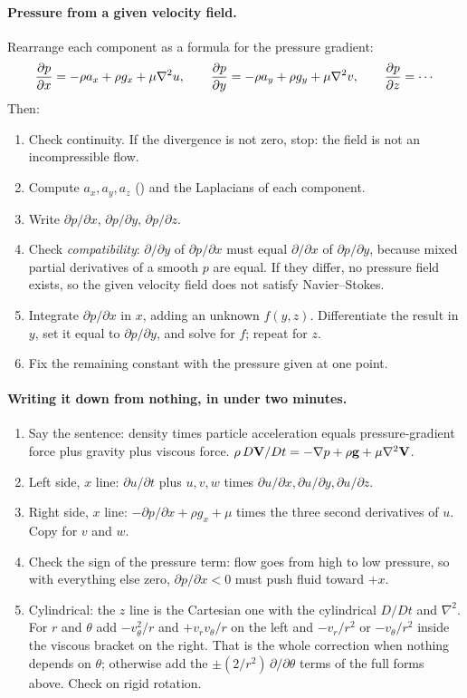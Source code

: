 \paragraph{Pressure from a given velocity field.} Rearrange each component as a formula for the pressure gradient:
\[
\frac{\partial p}{\partial x} = -\rho a_x + \rho g_x + \mu\nabla^2 u, \qquad \frac{\partial p}{\partial y} = -\rho a_y + \rho g_y + \mu\nabla^2 v, \qquad \frac{\partial p}{\partial z} = \cdots
\]
Then:
\begin{enumerate}[nosep,leftmargin=*]
\item Check continuity. If the divergence is not zero, stop: the field is not an incompressible flow.
\item Compute $a_x, a_y, a_z$ () and the Laplacians of each component.
\item Write $\partial p/\partial x$, $\partial p/\partial y$, $\partial p/\partial z$.
\item Check \emph{compatibility}: $\partial/\partial y$ of $\partial p/\partial x$ must equal $\partial/\partial x$ of $\partial p/\partial y$, because mixed partial derivatives of a smooth $p$ are equal. If they differ, no pressure field exists, so the given velocity field does not satisfy Navier--Stokes.
\item Integrate $\partial p/\partial x$ in $x$, adding an unknown $f(y,z)$. Differentiate the result in $y$, set it equal to $\partial p/\partial y$, and solve for $f$; repeat for $z$.
\item Fix the remaining constant with the pressure given at one point.
\end{enumerate}

\paragraph{Writing it down from nothing, in under two minutes.}
\begin{enumerate}[nosep,leftmargin=*]
\item Say the sentence: density times particle acceleration equals pressure-gradient force plus gravity plus viscous force. $\rho\,D\mathbf{V}/Dt = -\nabla p + \rho\mathbf{g} + \mu\nabla^2\mathbf{V}$.
\item Left side, $x$ line: $\partial u/\partial t$ plus $u, v, w$ times $\partial u/\partial x, \partial u/\partial y, \partial u/\partial z$.
\item Right side, $x$ line: $-\partial p/\partial x + \rho g_x + \mu$ times the three second derivatives of $u$. Copy for $v$ and $w$.
\item Check the sign of the pressure term: flow goes from high to low pressure, so with everything else zero, $\partial p/\partial x < 0$ must push fluid toward $+x$.
\item Cylindrical: the $z$ line is the Cartesian one with the cylindrical $D/Dt$ and $\nabla^2$. For $r$ and $\theta$ add $-v_\theta^2/r$ and $+v_rv_\theta/r$ on the left and $-v_r/r^2$ or $-v_\theta/r^2$ inside the viscous bracket on the right. That is the whole correction when nothing depends on $\theta$; otherwise add the $\pm(2/r^2)\,\partial/\partial\theta$ terms of the full forms above. Check on rigid rotation.
\end{enumerate}

